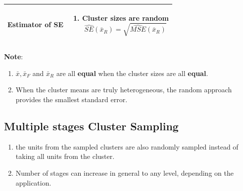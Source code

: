 \begin{longtable}{|p{5cm}|p{9cm}|}
    \textbf{Estimator of SE} & \begin{minipage}{8cm}
        \vspace{0.2cm}
        \begin{enumerate}
            \item Cluster sizes are random
            \[
                \hat{SE}(\bar{x}_R) =
                \sqrt{\hat{MSE}(\bar{x}_R)}
            \]
        \end{enumerate}
        \vspace{0.1cm}
    \end{minipage}\\
    \hline
\end{longtable}

\textbf{Note}:
\begin{enumerate}
    \item $\bar{x},\bar{x}_F $ and $\bar{x}_R$ are all \textbf{equal} when the cluster sizes are all \textbf{equal}.

    \item When the cluster means are truly heterogeneous, the random approach provides the smallest standard error.

\end{enumerate}


\subsection{Multiple stages Cluster Sampling \cite{ism-1}} \label{Multiple stages Cluster Sampling}

\begin{enumerate}
    \item the units from the sampled clusters are also randomly sampled instead of taking all units from the cluster.

    \item Number of stages can increase in general to any level, depending on the application.

\end{enumerate}



